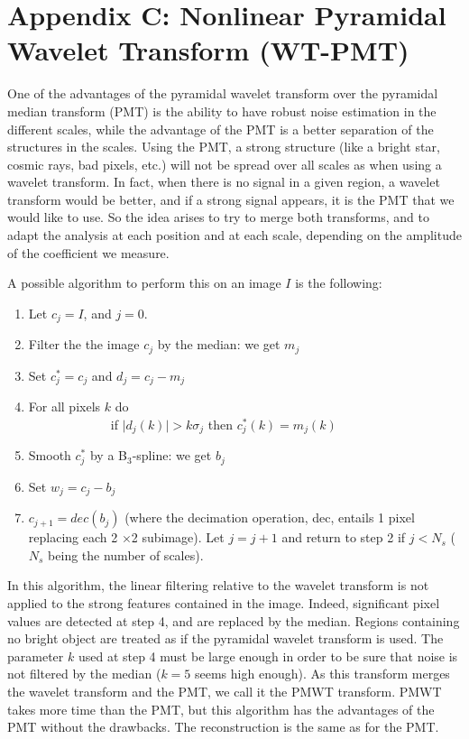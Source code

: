 \chapter*{Appendix C: Nonlinear Pyramidal Wavelet Transform (WT-PMT)}

One of the advantages of the pyramidal wavelet transform over the pyramidal
median transform (PMT) is the ability to have robust noise estimation in the 
different scales, while the advantage of the PMT is a better separation
of the structures in the scales. Using the PMT, 
a strong structure (like a bright star, cosmic rays, bad pixels, etc.) will 
not be spread over all scales as when using a wavelet transform. In fact, when
there is no signal in a given region, a wavelet transform would be better, and
if a strong signal appears, it is the PMT that we would like to use. So the 
idea arises 
to try to merge both transforms, and to adapt the analysis at each position
and at each scale, depending on the amplitude of the coefficient we measure.

A possible algorithm to perform this on an image $I$ is the following:
\begin{enumerate}
\item Let $c_j = I$, and $j=0$.
\item Filter the the image $c_j$ by the median: we get $m_j$
\item Set $c_j^* = c_j$ and $d_j= c_j - m_j$
\item For all pixels $k$ do \\
\ \ \ \ \ \ \ \ \ \ \ \ \ 
 if $\mid d_j(k) \mid > k \sigma_j$ then $c_j^*(k) = m_j(k)$
\item Smooth $c_j^*$  by a B$_3$-spline: we get $b_j$
\item Set $w_j = c_j - b_j$
\item  $c_{j+1} = dec(b_j)$ (where the decimation operation, dec, entails 1 pixel replacing
each 2 $\times$2 subimage).
Let $j=j+1$ and return to step 2 if $j < N_s$ ($N_s$ being the number of scales).
\end{enumerate}
In this algorithm, the linear filtering relative to the wavelet transform is
not applied to the strong features contained in the image. Indeed, significant
pixel values are detected at step 4, and are replaced by the median. Regions
containing no bright object are treated as if the pyramidal wavelet 
transform  is used. The parameter $k$ used at step 4 must be large enough
in order to be sure that noise is not filtered by the median ($k=5$ seems
high enough). As this transform merges the wavelet transform and the PMT, 
we call it the PMWT transform. 
PMWT takes more time than the PMT, but this algorithm has the
advantages of the PMT without the drawbacks. The reconstruction is the
same as for the PMT.


